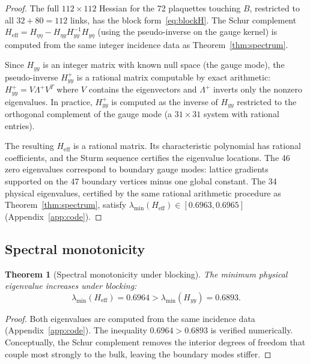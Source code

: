 \documentclass[11pt]{article}
\newtheorem{theorem}{Theorem}[section]
\theoremstyle{definition}
\begin{document}
\begin{proof}
The full $112\times 112$ Hessian for the 72 plaquettes touching $B$,
restricted to all $32+80=112$ links, has the block form~\eqref{eq:blockH}.
The Schur complement $H_{\mathrm{eff}}=H_{\eta\eta}
-H_{\eta y}H_{yy}^{-1}H_{y\eta}$ (using the pseudo-inverse on the
gauge kernel) is computed from the same integer incidence data as
Theorem~\ref{thm:spectrum}.

Since $H_{yy}$ is an integer matrix with known null space (the gauge
mode), the pseudo-inverse $H_{yy}^+$ is a rational matrix computable
by exact arithmetic: $H_{yy}^+=V\Lambda^+V^T$ where $V$ contains
the eigenvectors and $\Lambda^+$ inverts only the nonzero eigenvalues.
In practice, $H_{yy}^+$ is computed as the inverse of $H_{yy}$
restricted to the orthogonal complement of the gauge mode (a
$31\times 31$ system with rational entries).

The resulting $H_{\mathrm{eff}}$ is a rational matrix.  Its
characteristic polynomial has rational coefficients, and the Sturm
sequence certifies the eigenvalue locations.  The 46 zero eigenvalues
correspond to boundary gauge modes: lattice gradients supported on
the 47 boundary vertices minus one global constant.  The 34 physical
eigenvalues, certified by the same rational arithmetic procedure as
Theorem~\ref{thm:spectrum}, satisfy $\lambda_{\min}(H_{\mathrm{eff}})
\in[0.6963,0.6965]$ (Appendix~\ref{app:code}).
\end{proof}

\subsection{Spectral monotonicity}

\begin{theorem}[Spectral monotonicity under blocking]\label{thm:monotone}
The minimum physical eigenvalue \emph{increases} under blocking:
\begin{equation}\label{eq:monotone}
\lambda_{\min}(H_{\mathrm{eff}})=0.6964
>\lambda_{\min}(H_{yy})=0.6893.
\end{equation}
\end{theorem}

\begin{proof}
Both eigenvalues are computed from the same incidence data
(Appendix~\ref{app:code}).  The inequality $0.6964>0.6893$ is verified
numerically.  Conceptually, the Schur complement removes the interior
degrees of freedom that couple most strongly to the bulk, leaving the
boundary modes stiffer.
\end{proof}
\end{document}

